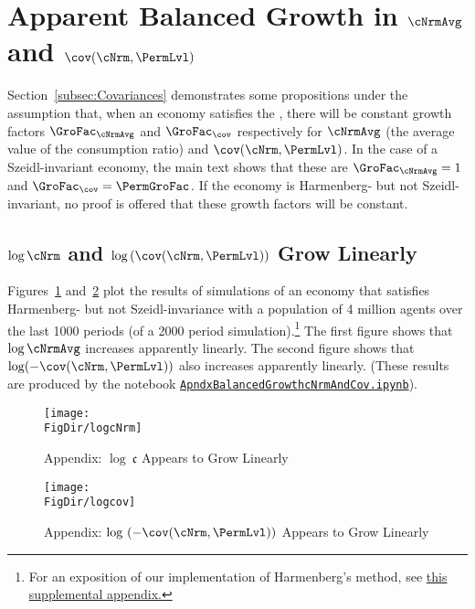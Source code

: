 \documentclass[\econtexRoot/BufferStockTheory]{subfiles}
\begin{document}
\hypertarget{ApndxBalancedGrowthcNrmAndCov}{}
\section{Apparent Balanced Growth in \texorpdfstring{$\cNrmAvg$}{c} and \texorpdfstring{$\cov(\cNrm,\PermLvl)$}{cov(c,p)}}\label{sec:ApndxBalancedGrowthcNrmAndCov}


Section~\ref{subsec:Covariances} demonstrates some propositions under the assumption that, when an economy satisfies the {\GICRaw}, there will be constant growth factors $\GroFac_{\cNrmAvg}$ and $\GroFac_{\cov}$ respectively for $\cNrmAvg$ (the average value of the consumption ratio) and $\cov(\cNrm,\PermLvl)$.  In the case of a Szeidl-invariant economy, the main text shows that these are $\GroFac_{\cNrmAvg}=1$ and $\GroFac_{\cov}=\PermGroFac$.  If the economy is Harmenberg- but not Szeidl-invariant, no proof is offered that these growth factors will be constant.

\subsection{\texorpdfstring{$\log \cNrm$}{log c} and \texorpdfstring{$\log \left(\cov(\cNrm,\PermLvl)\right)$}{log cov(c,p)} Grow Linearly}
Figures~\ref{fig:logcNrm} and~\ref{fig:logcov} plot the results of simulations of an economy that satisfies Harmenberg- but not Szeidl-invariance with a population of 4 million agents over the last 1000 periods (of a 2000 period simulation).\footnote{For an exposition of our implementation of Harmenberg's method, see \href{https://github.com/econ-ark/BufferStockTheory/blob/master/Appendices/ApndxHarKmenberg.pdf}{this supplemental appendix.}}  The first figure shows that $\log \cNrmAvg$ increases apparently linearly.  The second figure shows that $\log (-\cov(\cNrm,\PermLvl))$ also increases apparently linearly.  (These results are produced by the notebook \href{https://github.com/econ-ark/BufferStockTheory/blob/master/Code/Python/ApndxBalancedGrowthcNrmAndCov.ipynb}{\texttt{ApndxBalancedGrowthcNrmAndCov.ipynb}}).

\pagebreak
\begin{figure}[ht]
  \centerline{
    \texttt{[image: \\FigDir/logcNrm]}
  }
  \caption{Appendix: $\log ~\mathfrak{c}$ Appears to Grow Linearly}\label{fig:logcNrm}
\end{figure}
\begin{figure}[ht]
  \centerline{
    \texttt{[image: \\FigDir/logcov]}
  }
  \caption{Appendix: $\log ~(-\cov(\cNrm,\PermLvl))$ Appears to Grow Linearly}\label{fig:logcov}
\end{figure}
\end{document}
